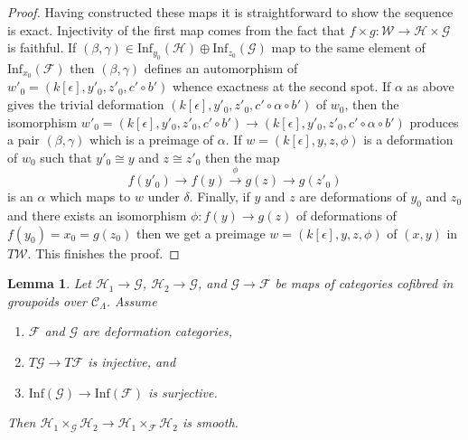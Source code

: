 \documentclass{stacks-project}
\theoremstyle{plain}
\newtheorem{lemma}[subsection]{Lemma}
\theoremstyle{definition}
\theoremstyle{remark}
\numberwithin{equation}{subsection}
\begin{document}
\begin{proof}
\medskip\noindent
Having constructed these maps it is straightforward to show the sequence
is exact. Injectivity of the first map comes from the fact that
$f \times g : \mathcal{W} \to \mathcal{H} \times \mathcal{G}$
is faithful. If
$(\beta, \gamma) \in
\text{Inf}_{y_0}(\mathcal{H}) \oplus \text{Inf}_{z_0}(\mathcal{G})$
map to the same element of $\text{Inf}_{x_0}(\mathcal{F})$ then
$(\beta, \gamma)$ defines an automorphism of
$w'_0 = (k[\epsilon], y'_0, z'_0, c' \circ b')$ whence exactness
at the second spot. If $\alpha$ as above gives the trivial deformation
$(k[\epsilon], y'_0, z'_0, c' \circ \alpha \circ b')$
of $w_0$, then the isomorphism
$w'_0 = (k[\epsilon], y'_0, z'_0, c' \circ b') \to
(k[\epsilon], y'_0, z'_0, c' \circ \alpha \circ b')$
produces a pair $(\beta, \gamma)$ which is a preimage of $\alpha$.
If $w = (k[\epsilon], y, z, \phi)$ is a deformation of $w_0$
such that $y'_0 \cong y$ and $z \cong z'_0$ then the map
$$
f(y'_0) \to f(y) \xrightarrow{\phi} g(z) \to g(z'_0)
$$
is an $\alpha$ which maps to $w$ under $\delta$.
Finally, if $y$ and $z$ are deformations of $y_0$ and $z_0$
and there exists an isomorphism $\phi : f(y) \to g(z)$ of deformations
of $f(y_0) = x_0 = g(z_0)$ then we get a preimage
$w = (k[\epsilon], y, z, \phi)$ of $(x, y)$ in $T\mathcal{W}$.
This finishes the proof.
\end{proof}

\begin{lemma}
\label{lemma-map-fibre-products-smooth}
Let $\mathcal{H}_1 \to \mathcal{G}$, $\mathcal{H}_2 \to \mathcal{G}$, and
$\mathcal{G} \to \mathcal{F}$ be maps of categories cofibred in groupoids
over $\mathcal{C}_\Lambda$. Assume
\begin{enumerate}
\item $\mathcal{F}$ and $\mathcal{G}$ are deformation categories,
\item $T\mathcal{G} \to T\mathcal{F}$ is injective, and
\item $\text{Inf}(\mathcal{G}) \to \text{Inf}(\mathcal{F})$ is surjective.
\end{enumerate}
Then $\mathcal{H}_1 \times_\mathcal{G} \mathcal{H}_2 \to
\mathcal{H}_1 \times_\mathcal{F} \mathcal{H}_2$ is smooth.
\end{lemma}
\end{document}
